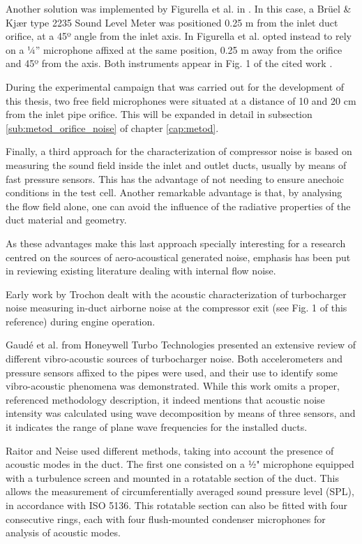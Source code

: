 Another solution was implemented by Figurella et al. in \cite{figurella2014noise}. In this case, a Brüel \& Kj\ae r type 2235 Sound Level Meter was positioned 0.25 m from the inlet duct orifice, at a 45º angle from the inlet axis. In \cite{figurella2014effect} Figurella et al. opted instead to rely on a ¼'' microphone affixed at the same position, 0.25 m away from the orifice and 45º from the axis. Both instruments appear in Fig. 1 of the cited work \cite{figurella2014effect}.

During the experimental campaign that was carried out for the development of this thesis, two free field microphones were situated at a distance of 10 and 20 cm from the inlet pipe orifice. This will be expanded in detail in subsection \ref{sub:metod_orifice_noise} of chapter \ref{cap:metod}.

Finally, a third approach for the characterization of compressor noise is based on measuring the sound field inside the inlet and outlet ducts, usually by means of fast pressure sensors. This has the advantage of not needing to ensure anechoic conditions in the test cell. Another remarkable advantage is that, by analysing the flow field alone, one can avoid the influence of the radiative properties of the duct material and geometry.

As these advantages make this last approach specially interesting for a research centred on the sources of aero-acoustical generated noise, emphasis has been put in reviewing existing literature dealing with internal flow noise.

Early work by Trochon \cite{trochon2001new} dealt with the acoustic characterization of turbocharger noise measuring in-duct airborne noise at the compressor exit (see Fig. 1 of this reference) during engine operation.

Gaudé et al. \cite{gaude2008experimental} from Honeywell Turbo Technologies presented an extensive review of different vibro-acoustic sources of turbocharger noise. Both accelerometers and pressure sensors affixed to the pipes were used, and their use to identify some vibro-acoustic phenomena was demonstrated. While this work omits a proper, referenced methodology description, it indeed mentions that acoustic noise intensity was calculated using wave decomposition by means of three sensors, and it indicates the range of plane wave frequencies for the installed ducts.

Raitor and Neise \cite{raitor2008sound} used different methods, taking into account the presence of acoustic modes in the duct. The first one consisted on a ½" microphone equipped with a turbulence screen and mounted in a rotatable section of the duct. This allows the measurement of circumferentially averaged sound pressure level (SPL), in accordance with ISO 5136. This rotatable section can also be fitted with four consecutive rings, each with four flush-mounted condenser microphones for analysis of acoustic modes.

